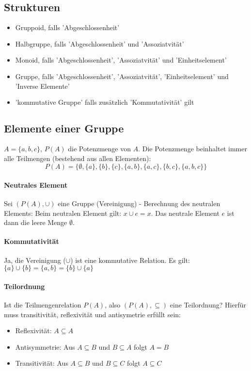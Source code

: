 
\subsection{Strukturen} %
\label{sub:strukturen}
  \begin{itemize}
    \item Gruppoid, falls 'Abgeschlossenheit'
    \item Halbgruppe, falls 'Abgeschlossenheit' und 'Assoziatvität'
    \item Monoid, falls 'Abgeschlossenheit', 'Assoziatvität' und 'Einheitselement'
    \item Gruppe, falls 'Abgeschlossenheit', 'Assoziatvität', 'Einheitselement' und 'Inverse Elemente'
    \item 'kommutative Gruppe' falls zusätzlich 'Kommutativität' gilt
  \end{itemize}

\subsection{Elemente einer Gruppe} %
\label{sub:elemente_einer_gruppe}
  $A=\{a,b,c\}$, $P(A)$ die Potenzmenge von $A$.
  Die Potenzmenge beinhaltet immer alle Teilmengen (bestehend aus allen Elementen):
  \begin{equation}
    P(A) = \{ \emptyset, \{a\}, \{b\}, \{c\},\{a,b\},\{a,c\},\{b,c\},\{a,b,c\}\}
  \end{equation}
  
  \paragraph*{Neutrales Element}
    Sei $(P(A),\cup)$ eine Gruppe (Vereinigung) - Berechnung des neutralen Elements:
    Beim neutralen Element gilt: $x \cup e = x$. Das neutrale Element $e$ ist dann
    die leere Menge $ \emptyset $.
  \paragraph*{Kommutativität}
    Ja, die Vereinigung ($\cup$) ist eine kommutative Relation. Es gilt: $\{a\} \cup \{b\} = \{a,b\} = \{b\}\cup\{a\} $
  
  \paragraph*{Teilordnung} Ist die Teilmengenrelation $P(A)$, also $(P(A),\subseteq)$ eine Teilordnung?
  Hierfür muss transitivität, reflexivität und antisymetrie erfüllt sein:
  \begin{itemize}
    \item Reflexivität: $A \subseteq A$
    \item Antisymmetrie: Aus $A \subseteq B$ und $B\subseteq A$ folgt $A = B$
    \item Transitivität: Aus $A \subseteq B$ und $B \subseteq C$ folgt $A \subseteq C$
  \end{itemize}
  
